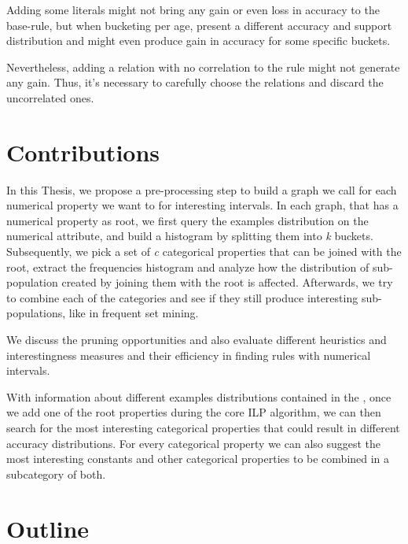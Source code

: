 Adding some literals might not bring any gain or even loss in accuracy to the base-rule, but when bucketing per age, present a
different accuracy and support distribution and might even produce gain in accuracy for some specific buckets.

Nevertheless, adding a relation with no correlation to the rule might not generate any gain. Thus, it's necessary to carefully choose the relations and discard the uncorrelated ones.  

\section{Contributions}
In this Thesis, we propose a pre-processing step to build a graph we call \graphname for each numerical property we want to for interesting intervals. In each graph, that has a numerical property as root, we first query the examples distribution on the numerical attribute, and build a histogram by splitting them into \emph{k} buckets. Subsequently, we pick a set of \emph{c} categorical properties that can be joined with the root, extract the frequencies histogram and analyze how the distribution of sub-population created by joining them with the root is affected. Afterwards, we try to combine each of the categories and see if they still produce interesting sub-populations, like in frequent set
mining.

We discuss the pruning opportunities and also evaluate different heuristics and interestingness measures and their efficiency in finding rules with numerical intervals. 

\begin{comment}
In a clause containing a numerical attribute in the body, we can obtain a support and accuracy as well as support value
for each of the buckets. Therewith, we can search the most interesting intervals that satisfies the support and accuracy
thresholds
\end{comment}

With information about different examples distributions contained in the \graphname, once we add one of the root properties during the core ILP algorithm, we can then search for the most interesting categorical properties that could result in different accuracy distributions. For every categorical property we can also suggest the most interesting constants and other categorical properties to be combined in a subcategory of both.

\section{Outline}

